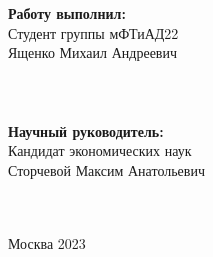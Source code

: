\documentclass[a4paper, 14pt]{extarticle}
\begin{document}
    \begin{flushright} %
      \begin{minipage}{0.4\textwidth} %
        \begin{flushleft} %
          
          \small\textbf{Работу выполнил:}\\
          \small Студент группы мФТиАД22 \\
          \small Ященко Михаил Андреевич\\
          \hspace{0.2mm} \\
          \underline{\hspace{6cm}} \\

          \hspace{2cm} \\
          
          \small \textbf{Научный руководитель:}\\
          \small Кандидат экономических наук \\
          \small Сторчевой Максим Анатольевич \\
          \hspace{0.2mm} \\
          \underline{\hspace{6cm}} \\
          
          
        \end{flushleft}
      \end{minipage}
    \end{flushright}
    \vfill
    \begin{center} \small Москва 2023 \end{center}
    \thispagestyle{empty} %

\newpage
\setcounter{page}{2}
\end{document}
